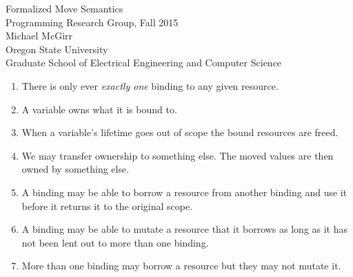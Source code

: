\documentclass[10pt]{article}
\begin{document}
\vspace{2.0cm}

\begin{center}
    {\huge Formalized Move Semantics} 
    \vspace{0.1in} \\
    {\large Programming Research Group, Fall 2015} 
    \vspace{0.1in} \\
    {\large Michael McGirr} 
    \vspace{0.1in} \\
    {\large Oregon State University} 
    \vspace{0.1in} \\
    {\large Graduate School of Electrical Engineering and Computer Science}  
\end{center}

\vspace{1.0cm}

\begin{enumerate}
    \item There is only ever \textit{exactly one} binding to any given resource.

    \item A variable owns what it is bound to.

    \item When a variable's lifetime goes out of scope the bound resources are freed.

    \item We may transfer ownership to something else. The moved values are then
          owned by something else.

    \item A binding may be able to borrow a resource from another binding and
          use it before it returns it to the original scope.

    \item A binding may be able to mutate a resource that it borrows as long as
          it has not been lent out to more than one binding.

    \item More than one binding may borrow a resource but they may not mutate it.


\end{enumerate}
\end{document}
